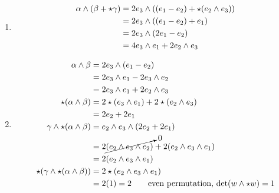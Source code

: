 \documentclass{article}
\begin{document}
\begin{enumerate}[label=(\alph*)]
    \item
    \begin{align}
        \alpha \wedge (\beta + \star \gamma)
            &= 2e_3 \wedge((e_1-e_2) + \star(e_2 \wedge e_3)) \notag\\
            &= 2e_3 \wedge((e_1-e_2) + e_1) \notag\\
            &= 2e_3 \wedge(2e_1-e_2) \notag\\
            &= 4 e_3 \wedge e_1 + 2 e_2 \wedge e_3 \notag
    \end{align}

    \item
    \begin{align}
        \alpha \wedge \beta &= 2e_3 \wedge (e_1 - e_2) \notag\\
            &= 2e_3 \wedge e_1 -  2e_3 \wedge e_2 \notag\\
            &= 2e_3 \wedge e_1 +  2e_2 \wedge e_3 \notag\\
        \star(\alpha \wedge \beta) &= 2\star(e_3 \wedge e_1) +  2\star(e_2 \wedge e_3) \notag\\
            &= 2e_2 + 2e_1 \notag\\
        \gamma \wedge \star(\alpha \wedge \beta) &= e_2 \wedge e_3 \wedge (2e_2 + 2e_1) \notag\\
        &= 2\cancelto{0}{(e_2 \wedge e_3 \wedge e_2)} + 2(e_2 \wedge e_3 \wedge e_1) \notag\\
        &= 2(e_2 \wedge e_3 \wedge e_1) \notag\\
        \star(\gamma \wedge \star(\alpha \wedge \beta))
            &= 2 \star(e_2 \wedge e_3 \wedge e_1) \notag\\
            &= 2 (1) = 2 \tag*{even permutation, $\det(w \wedge \star w) = 1$}
    \end{align}
\end{enumerate}


\vspace{1.8cm}
\\\\
\end{document}
